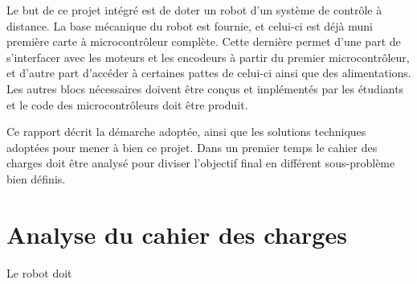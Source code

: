 Le but de ce projet intégré est de doter un robot d'un système de contrôle à distance. La base mécanique du robot est fournie, et celui-ci est déjà muni première carte à microcontrôleur complète. Cette dernière permet d'une part de s'interfacer avec les moteurs et les encodeurs à partir du premier microcontrôleur, et d'autre part d'accéder à certaines pattes de celui-ci ainsi que des alimentations. Les autres blocs nécessaires doivent être conçus et implémentés par les étudiants et le code des microcontrôleurs doit être produit.

Ce rapport décrit la démarche adoptée, ainsi que les solutions techniques adoptées pour mener à bien ce projet. Dans un premier temps le cahier des charges doit être analysé pour diviser l'objectif final en différent sous-problème bien définis.

\section{Analyse du cahier des charges}
Le robot doit 

